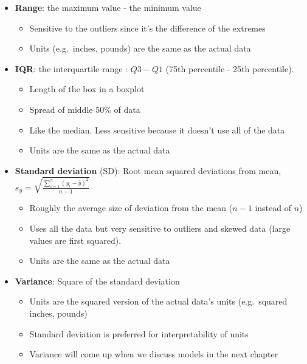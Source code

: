 \documentclass[
]{book}
\providecommand{\tightlist}{%
  \setlength{\itemsep}{0pt}\setlength{\parskip}{0pt}}
\begin{document}
\begin{itemize}
\tightlist
\item
  \textbf{Range}: the maximum value - the minimum value

  \begin{itemize}
  \tightlist
  \item
    Sensitive to the outliers since it's the difference of the extremes
  \item
    Units (e.g.~inches, pounds) are the same as the actual data
  \end{itemize}
\item
  \textbf{IQR}: the interquartile range : \(Q3 - Q1\) (75th percentile - 25th percentile).

  \begin{itemize}
  \tightlist
  \item
    Length of the box in a boxplot
  \item
    Spread of middle 50\% of data
  \item
    Like the median. Less sensitive because it doesn't use all of the data
  \item
    Units are the same as the actual data
  \end{itemize}
\item
  \textbf{Standard deviation} (SD): Root mean squared deviations from mean, \(s_y = \sqrt{\frac{\sum^n_{i=1}(y_i-\bar{y})^2}{n-1}}\)

  \begin{itemize}
  \tightlist
  \item
    Roughly the average size of deviation from the mean (\(n-1\) instead of \(n\))
  \item
    Uses all the data but very sensitive to outliers and skewed data (large values are first squared).
  \item
    Units are the same as the actual data
  \end{itemize}
\item
  \textbf{Variance}: Square of the standard deviation

  \begin{itemize}
  \tightlist
  \item
    Units are the squared version of the actual data's units (e.g.~squared inches, pounds)
  \item
    Standard deviation is preferred for interpretability of units
  \item
    Variance will come up when we discuss models in the next chapter
  \end{itemize}
\end{itemize}
\end{document}
